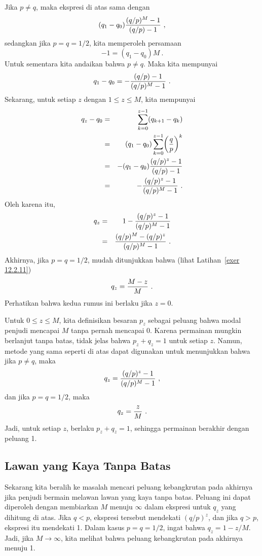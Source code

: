 Jika $p \ne q$, maka ekspresi di atas sama dengan
$$(q_1 - q_0) {{(q/p)^M - 1}\over{(q/p) - 1}}\ ,$$
sedangkan jika $p = q = 1/2$, kita memperoleh persamaan
$$-1 = (q_1 - q_0) M\ .$$
Untuk sementara kita andaikan bahwa $p \ne q$. Maka kita mempunyai
$$q_1 - q_0 = -{{(q/p) - 1}\over{(q/p)^M - 1}}\ .$$
Sekarang, untuk setiap $z$ dengan $1 \le z \le M$, kita mempunyai
\begin{eqnarray*}
q_z - q_0 &=& \sum_{k = 0}^{z-1} (q_{k+1} - q_k)\\
          &=& (q_1 - q_0)\sum_{k = 0}^{z-1} \biggl({q\over p}\biggr)^k\\
          &=& -(q_1 - q_0){{(q/p)^z - 1}\over{(q/p) - 1}}\\
          &=& -{{(q/p)^z - 1}\over{(q/p)^M - 1}}\ .
\end{eqnarray*}
Oleh karena itu,
\begin{eqnarray*}
q_z &=& 1 - {{(q/p)^z - 1}\over{(q/p)^M - 1}}\\
    &=& {{(q/p)^M - (q/p)^z}\over{(q/p)^M - 1}}\ .
\label{eq 12.2.3}
\end{eqnarray*}
Akhirnya, jika $p = q = 1/2$, mudah ditunjukkan bahwa (lihat
Latihan~\ref{exer 12.2.11})
$$q_z = {{M - z}\over M}\ .$$
Perhatikan bahwa kedua rumus ini berlaku jika $z = 0$.
\par
Untuk $0 \le z \le M$, kita definisikan besaran $p_z$ sebagai peluang bahwa
modal penjudi mencapai $M$ tanpa pernah mencapai 0. Karena permainan mungkin
berlanjut tanpa batas, tidak jelas bahwa $p_z + q_z = 1$ untuk setiap $z$.
Namun, metode yang sama seperti di atas dapat digunakan untuk menunjukkan bahwa
jika $p \ne q$, maka
$$q_z = {{(q/p)^z - 1}\over{(q/p)^M - 1}}\ ,$$
dan jika $p = q = 1/2$, maka
$$q_z = {z\over M}\ .$$
Jadi, untuk setiap $z$, berlaku $p_z + q_z = 1$, sehingga permainan berakhir
dengan peluang 1.

\subsection*{Lawan yang Kaya Tanpa Batas}

Sekarang kita beralih ke masalah mencari peluang kebangkrutan pada akhirnya
jika penjudi bermain melawan lawan yang kaya tanpa batas. Peluang ini dapat
diperoleh dengan membiarkan $M$ menuju $\infty$ dalam ekspresi untuk $q_z$ yang
dihitung di atas. Jika $q < p$, ekspresi tersebut mendekati $(q/p)^z$, dan jika
$q > p$, ekspresi itu mendekati 1. Dalam kasus $p = q = 1/2$, ingat bahwa
$q_z = 1 - z/M$. Jadi, jika $M \rightarrow \infty$, kita melihat bahwa peluang
kebangkrutan pada akhirnya menuju 1.  

